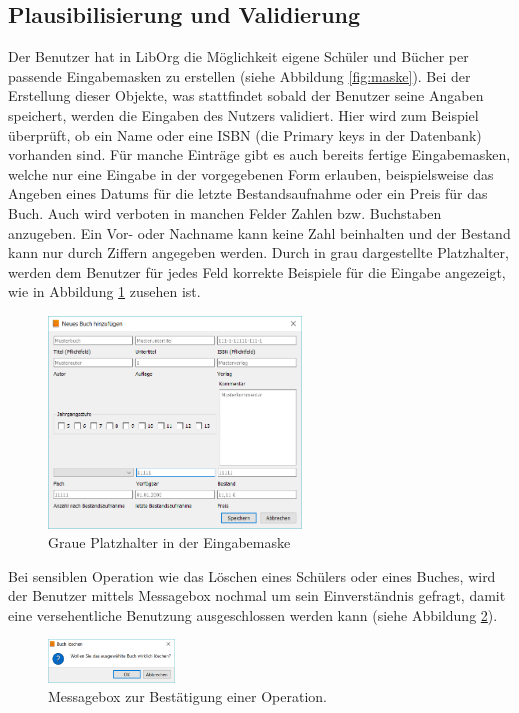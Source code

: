 \subsection{Plausibilisierung und Validierung}
Der Benutzer hat in LibOrg die Möglichkeit eigene Schüler und Bücher per passende Eingabemasken zu erstellen (siehe Abbildung \ref{fig:maske}). Bei der Erstellung dieser Objekte, was stattfindet sobald der Benutzer seine Angaben speichert, werden die Eingaben des Nutzers validiert. Hier wird zum Beispiel überprüft, ob ein Name oder eine ISBN (die Primary keys in der Datenbank) vorhanden sind. Für manche Einträge gibt es auch bereits fertige Eingabemasken, welche nur eine Eingabe in der vorgegebenen Form erlauben, beispielsweise das Angeben eines Datums für die letzte Bestandsaufnahme oder ein Preis für das Buch. Auch wird verboten in manchen Felder Zahlen bzw. Buchstaben anzugeben. Ein Vor- oder Nachname kann keine Zahl beinhalten und der Bestand kann nur durch Ziffern angegeben werden. Durch in grau dargestellte Platzhalter, werden dem Benutzer für jedes Feld korrekte Beispiele für die Eingabe angezeigt, wie in Abbildung \ref{fig:grey} zusehen ist.
\begin{figure}[H]
	\centering
	\includegraphics[width=0.60\textwidth]{figures/konzept/grey.PNG}
	\caption{Graue Platzhalter in der Eingabemaske}
	\label{fig:grey}
\end{figure}
Bei sensiblen Operation wie das Löschen eines Schülers oder eines Buches, wird der Benutzer mittels Messagebox nochmal um sein Einverständnis gefragt, damit eine versehentliche Benutzung ausgeschlossen werden kann (siehe Abbildung \ref{fig:messagebox}).
\begin{figure}[H]
	\centering
	\includegraphics[width=0.30\textwidth]{figures/konzept/messagebox.PNG}
	\caption{Messagebox zur Bestätigung einer Operation.}
	\label{fig:messagebox}
\end{figure}

